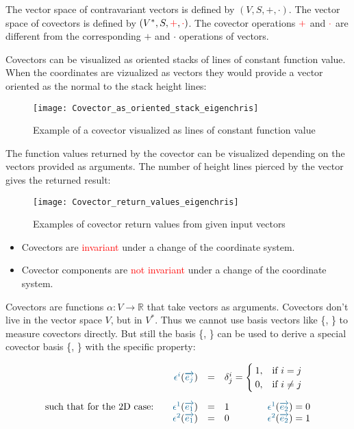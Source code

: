 The vector space of contravariant vectors is defined by $(V,S,+,\cdot)$. The vector space
of covectors is defined by $(V^*,S,\textcolor{red}{+},\textcolor{red}{\cdot})$. The
covector operations $\textcolor{red}{+}$ and $\textcolor{red}{\cdot}$ are different from
the corresponding $+$ and $\cdot$ operations of vectors.

Covectors can be visualized as oriented stacks of lines of constant function value. When
the coordinates are vizualized as vectors they would provide a vector oriented as the
normal to the stack height lines:
\begin{figure}[h]
    \centering
    \texttt{[image: Covector\_as\_oriented\_stack\_eigenchris]}
    \caption{Example of a covector visualized as lines of constant function value}
    \label{fig:covector_visualized}
\end{figure}

The function values returned by the covector can be visualized depending on the vectors
provided as arguments. The number of height lines pierced by the vector gives the returned
result:
\begin{figure}[h]
    \centering
    \texttt{[image: Covector\_return\_values\_eigenchris]}
    \caption{Examples of covector return values from given input vectors}
    \label{fig:covector_return_values}
\end{figure}

\begin{itemize}
    \item Covectors are \textcolor{red}{invariant} under a change of the coordinate
    system.
    \item Covector components are \textcolor{red}{not invariant} under a change of the
    coordinate system.
\end{itemize}

Covectors are functions $\alpha: V \rightarrow \mathbb{R}$ that take vectors as arguments.
Covectors don't live in the vector space $V$, but in $V^*$. Thus we cannot use basis
vectors like \{, \} to measure covectors directly. But still the basis
\{, \} can be used to derive a special covector basis \{,
\} with the specific property:

\begin{equation}
    \label{eq:covec_vec_link}
    \begin{array}{rcl}
        \hdcbvc{i}(\hdbv{j}) & = &
        \delta^i_j = 
        \begin{cases}
            1, & \text{if}\ i = j \\
            0, & \text{if}\ i \neq j
        \end{cases} \\
        \noalign{\vskip10pt}
        \text{such that for the 2D case:}\qquad
        \hdcbvc{1}(\hdbv{1}) & = & 1 \qquad\qquad
        \hdcbvc{1}(\hdbv{2}) = 0 \\
        \hdcbvc{2}(\hdbv{1}) & = & 0 \qquad\qquad
        \hdcbvc{2}(\hdbv{2}) = 1
    \end{array}
\end{equation}

